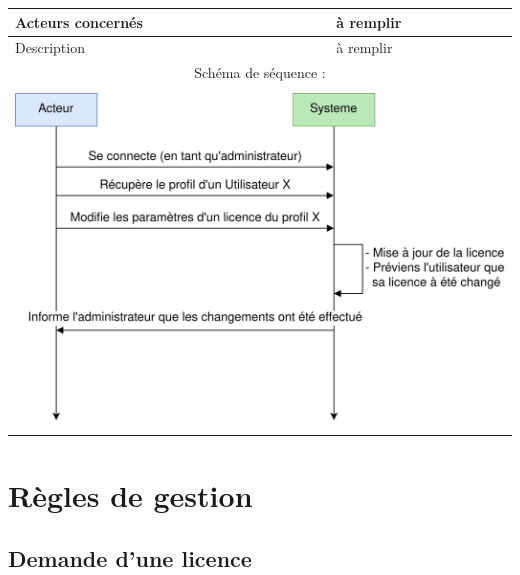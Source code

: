 \begin{table}[!h]
        \centering
        \begin{tabular}{| m{5cm} | m{10cm} |}
                \hline
                    Acteurs concernés & à remplir \\
                \hline
                    Description & à remplir \\
                \hline
                    \multicolumn{2}{|c|}{Schéma de séquence :} \\
                \hline
                    \multicolumn{2}{|c|}{}\\
                    \multicolumn{2}{|c|}{\includegraphics[width=15cm]{main/png/seq_parametrage.png}} \\
                \hline
        \end{tabular}
        \label{tab:tab5}
\end{table}
\newpage

\section{Règles de gestion}

\subsection{Demande d'une licence}
	
